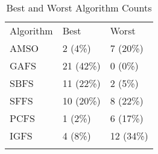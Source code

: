 \begin{table}
\caption{Best and Worst Algorithm Counts}
\label{tbl:best:worst:count}
\begin{tabular}{lll}
\noalign{\smallskip}\hline\noalign{\smallskip}
Algorithm&Best&Worst\\
\noalign{\smallskip}\hline
AMSO&2 (4\%)&7 (20\%)\\
GAFS&21 (42\%)&0 (0\%)\\
SBFS&11 (22\%)&2 (5\%)\\
SFFS&10 (20\%)&8 (22\%)\\
PCFS&1 (2\%)&6 (17\%)\\
IGFS&4 (8\%)&12 (34\%)\\
\noalign{\smallskip}\hline
\end{tabular}
\end{table}
